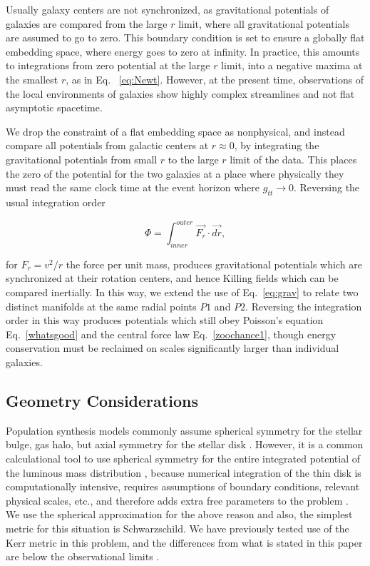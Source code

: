 \documentclass[reprint,%
 amsmath,amssymb,
 aps,
]{revtex4-1}
\begin{document}
    
  
  Usually galaxy centers are not synchronized,  as gravitational potentials of galaxies   are compared from the   large $r$ limit, where all  gravitational potentials are assumed  to go to zero. This boundary condition is set  to ensure a  globally  flat embedding space,  where energy goes to zero at infinity. 
In practice, this amounts to integrations   from zero potential at  the large $r$ limit,  into a negative maxima at the smallest $r$,  
  as in Eq.~  \ref{eq:Newt}.  
  However,  at the present time,  observations of  the local environments of galaxies show highly complex streamlines \cite{Pomarede:2020pme,Hoffman:2017ako} and not flat asymptotic spacetime. 

  
 We drop the constraint of a flat embedding space as nonphysical, and  instead compare all    potentials    from galactic centers at $r\approx 0$, by integrating the gravitational potentials from small $r$ to the large $r$ limit of the data. This places the zero of the potential for the two galaxies at a  place where physically they must read the same clock time  at the event horizon where  $g_{tt} \to 0$.  Reversing the usual integration order 
 
  \begin{equation}
     \Phi  =    \int_{inner}^{outer} \vec{F_r}\cdot\vec{dr}, 
      \label{eq:Newt2}
      \end{equation}
      
for $F_r = v^2/r$ the force per unit mass, produces gravitational 
potentials  which are synchronized at their rotation centers, and hence Killing fields which can be compared inertially. 
In this way, we extend the use of Eq.~\ref{eq:grav}  to relate two distinct manifolds at the same radial points $P1$ and $P2$.  
 Reversing the integration order    in this way produces potentials which still obey Poisson's equation Eq.~\ref{whatsgood} and the central force law Eq.~\ref{zoochance1}, though energy conservation must be reclaimed on scales significantly larger than individual galaxies.

 
\subsection{  Geometry Considerations  }\label{GeomSphere}
  
   Population synthesis models commonly assume spherical symmetry for the 
  stellar bulge, gas halo, but   axial symmetry for    the stellar disk \cite{1954AJ.....59..273S,Freeman}.
 However, it is a common calculational  tool to use spherical symmetry for the entire integrated potential of the luminous mass distribution  \cite{2022A&A...664A..40M,PhysRevD.70.083509}, because numerical integration of the thin disk is  computationally intensive,  requires assumptions of  boundary conditions,   relevant physical scales,  etc., and therefore adds extra free parameters to the problem \cite{2011A&A...531A..36H}.  
 We   use the spherical approximation   for the above reason and also,   the simplest metric for this situation is  
 Schwarzschild. We have previously tested use of the Kerr metric in this problem, and the   differences from what is stated in this paper are below the   observational limits \cite{Cisn}. 
 
\end{document}
